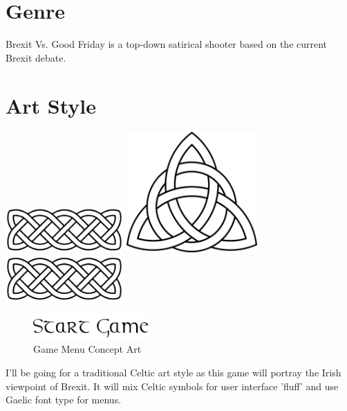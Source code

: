 \documentclass[a4paper]{scrreprt}
\begin{document}
\section{Genre}
Brexit Vs. Good Friday is a top-down satirical shooter based on the current Brexit debate.

\section{Art Style}

\begin{center}
\includegraphics[width=4.5cm]{celtic-knot}
\includegraphics[width=5cm]{celtic-knot-arrow}
\includegraphics[width=4.5cm]{celtic-knot}
\begin{figure}[H]
\centering
\includegraphics[width=4.5cm]{start-game}
\caption{\label{fig:art} Game Menu Concept Art}
\end{figure}
\end{center}

I'll be going for a traditional Celtic art style as this game will portray the Irish viewpoint of Brexit. 
It will mix Celtic symbols for user interface 'fluff' and use Gaelic font type for menus.
\end{document}
